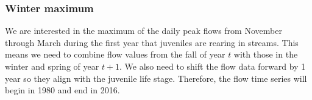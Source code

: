 \documentclass[11pt,]{article}
\newenvironment{Shaded}{}{}
\newcommand{\KeywordTok}[1]{\textcolor[rgb]{0.00,0.00,1.00}{#1}}
\newcommand{\DataTypeTok}[1]{#1}
\newcommand{\FloatTok}[1]{#1}
\newcommand{\StringTok}[1]{\textcolor[rgb]{0.00,0.50,0.50}{#1}}
\newcommand{\OtherTok}[1]{\textcolor[rgb]{1.00,0.25,0.00}{#1}}
\newcommand{\OperatorTok}[1]{#1}
\newcommand{\NormalTok}[1]{#1}
\begin{document}
\begin{Shaded}
\end{Shaded}

\subsubsection{Winter maximum}\label{winter-maximum}

We are interested in the maximum of the daily peak flows from November
through March during the first year that juveniles are rearing in
streams. This means we need to combine flow values from the fall of year
\(t\) with those in the winter and spring of year \(t+1\). We also need
to shift the flow data forward by 1 year so they align with the juvenile
life stage. Therefore, the flow time series will begin in 1980 and end
in 2016.
\end{document}
